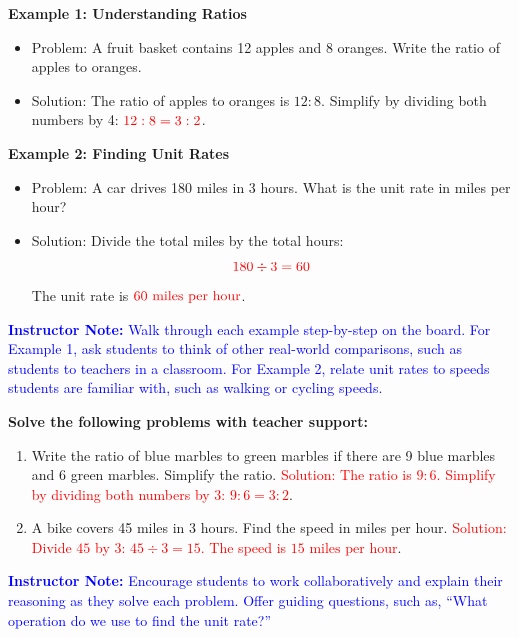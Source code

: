 \documentclass[12pt]{article}
\begin{document}
\begin{tcolorbox}[colframe=black!60, colback=white, 
coltitle=black, colbacktitle=black!15, fonttitle=\bfseries\Large, 
title=Examples, halign title=center, left=10pt, right=10pt, top=10pt, bottom=15pt]
\textbf{Example 1: Understanding Ratios}  
\begin{itemize}
    \item Problem: A fruit basket contains 12 apples and 8 oranges. Write the ratio of apples to oranges.  
    \item Solution: The ratio of apples to oranges is \( 12:8 \). Simplify by dividing both numbers by 4: \( \textcolor{red}{12:8 = 3:2} \).  
\end{itemize}

\textbf{Example 2: Finding Unit Rates}  
\begin{itemize}
    \item Problem: A car drives 180 miles in 3 hours. What is the unit rate in miles per hour?  
    \item Solution: Divide the total miles by the total hours:  
    \[ \textcolor{red}{180 \div 3 = 60} \]  
    The unit rate is \( \textcolor{red}{60 \text{ miles per hour}} \).  
\end{itemize}
\textcolor{blue}{\textbf{Instructor Note:} Walk through each example step-by-step on the board. For Example 1, ask students to think of other real-world comparisons, such as students to teachers in a classroom. For Example 2, relate unit rates to speeds students are familiar with, such as walking or cycling speeds.}
\end{tcolorbox}

\begin{tcolorbox}[colframe=black!60, colback=white, 
coltitle=black, colbacktitle=black!15, fonttitle=\bfseries\Large, 
title=Guided Practice, halign title=center, left=10pt, right=10pt, top=10pt, bottom=15pt]
\textbf{Solve the following problems with teacher support:}
\begin{enumerate}[itemsep=3em]
    \item Write the ratio of blue marbles to green marbles if there are 9 blue marbles and 6 green marbles. Simplify the ratio.  
    \textcolor{red}{Solution: The ratio is \( 9:6 \). Simplify by dividing both numbers by 3: \( 9:6 = 3:2 \)}.  

    \item A bike covers 45 miles in 3 hours. Find the speed in miles per hour.  
    \textcolor{red}{Solution: Divide \( 45 \) by \( 3 \): \( 45 \div 3 = 15 \). The speed is \( 15 \text{ miles per hour} \)}.  
\end{enumerate}
\textcolor{blue}{\textbf{Instructor Note:} Encourage students to work collaboratively and explain their reasoning as they solve each problem. Offer guiding questions, such as, “What operation do we use to find the unit rate?”}
\end{tcolorbox}
\end{document}
